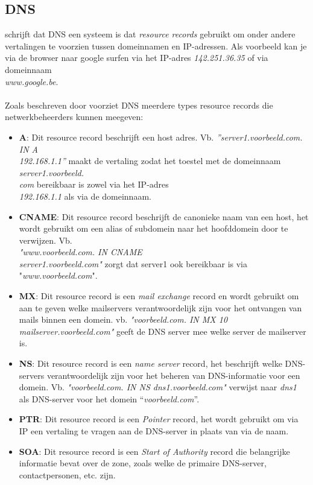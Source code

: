 \documentclass{hogent-article}
\begin{document}
\subsection{DNS}
\textcite{Mockapetris1987} schrijft dat DNS een systeem is dat \textit{resource records} gebruikt om onder andere vertalingen te voorzien tussen domeinnamen en IP-adressen. Als voorbeeld kan je via de browser naar google surfen via het IP-adres \textit{142.251.36.35} of via domeinnaam\\ \textit{www.google.be}.
\\ \\
Zoals beschreven door \textcite{Mockapetris1987} voorziet DNS meerdere types resource records die netwerkbeheerders kunnen meegeven: 
\begin{itemize}
    \item \textbf{A}: Dit resource record beschrijft een host adres. 
    Vb. \textit{”server1.voorbeeld.com. IN A \\192.168.1.1”} maakt de vertaling zodat het toestel met de domeinnaam \textit{server1.voorbeeld.\\com} bereikbaar is zowel via het IP-adres\\ \textit{192.168.1.1} als via de domeinnaam. 
    \item \textbf{CNAME}: Dit resource record beschrijft de canonieke naam van een host, het wordt gebruikt om een alias of subdomein naar het hoofddomein door te verwijzen. Vb.\\ \textit{"www.voorbeeld.com. IN CNAME \\server1.voorbeeld.com"} zorgt dat server1 ook bereikbaar is via "\textit{www.voorbeeld.com}".
    \item \textbf{MX}: Dit resource record is een \textit{mail exchange} record en wordt gebruikt om aan te geven welke mailservers verantwoordelijk zijn voor het ontvangen van mails binnen een domein. vb. \textit{"voorbeeld.com. IN MX 10 mailserver.voorbeeld.com"} geeft de DNS server mee welke server de mailserver is.
    \item \textbf{NS}: Dit resource record is een \textit{name server} record, het beschrijft welke DNS-servers verantwoordelijk zijn voor het beheren van DNS-informatie voor een domein. Vb. \textit{"voorbeeld.com. IN NS dns1.voorbeeld.com"} verwijst naar \textit{dns1} als DNS-server voor het domein “\textit{voorbeeld.com}”.
    \item \textbf{PTR}: Dit resource record is een \textit{Pointer} record, het wordt gebruikt om via IP een vertaling te vragen aan de DNS-server in plaats van via de naam.
    \item \textbf{SOA}: Dit resource record is een \textit{Start of Authority} record die belangrijke informatie bevat over de zone, zoals welke de primaire DNS-server, contactpersonen, etc. zijn.
\end{itemize}
\end{document}
